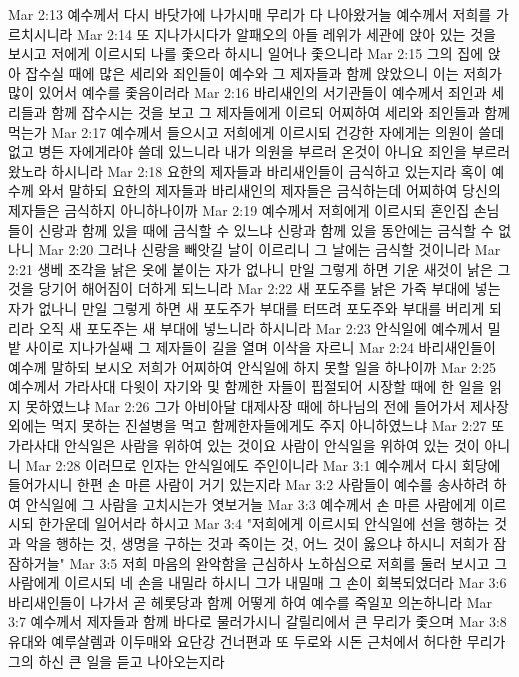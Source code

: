 Mar 2:13  예수께서 다시 바닷가에 나가시매 무리가 다 나아왔거늘 예수께서 저희를 가르치시니라
Mar 2:14  또 지나가시다가 알패오의 아들 레위가 세관에 앉아 있는 것을 보시고 저에게 이르시되 나를 좇으라 하시니 일어나 좇으니라
Mar 2:15  그의 집에 앉아 잡수실 때에 많은 세리와 죄인들이 예수와 그 제자들과 함께 앉았으니 이는 저희가 많이 있어서 예수를 좇음이러라
Mar 2:16  바리새인의 서기관들이 예수께서 죄인과 세리들과 함께 잡수시는 것을 보고 그 제자들에게 이르되 어찌하여 세리와 죄인들과 함께 먹는가
Mar 2:17  예수께서 들으시고 저희에게 이르시되 건강한 자에게는 의원이 쓸데 없고 병든 자에게라야 쓸데 있느니라 내가 의원을 부르러 온것이 아니요 죄인을 부르러 왔노라 하시니라
Mar 2:18  요한의 제자들과 바리새인들이 금식하고 있는지라 혹이 예수께 와서 말하되 요한의 제자들과 바리새인의 제자들은 금식하는데 어찌하여 당신의 제자들은 금식하지 아니하나이까
Mar 2:19  예수께서 저희에게 이르시되 혼인집 손님들이 신랑과 함께 있을 때에 금식할 수 있느냐 신랑과 함께 있을 동안에는 금식할 수 없나니
Mar 2:20  그러나 신랑을 빼앗길 날이 이르리니 그 날에는 금식할 것이니라
Mar 2:21  생베 조각을 낡은 옷에 붙이는 자가 없나니 만일 그렇게 하면 기운 새것이 낡은 그것을 당기어 해어짐이 더하게 되느니라
Mar 2:22  새 포도주를 낡은 가죽 부대에 넣는 자가 없나니 만일 그렇게 하면 새 포도주가 부대를 터뜨려 포도주와 부대를 버리게 되리라 오직 새 포도주는 새 부대에 넣느니라 하시니라
Mar 2:23  안식일에 예수께서 밀밭 사이로 지나가실쌔 그 제자들이 길을 열며 이삭을 자르니
Mar 2:24  바리새인들이 예수께 말하되 보시오 저희가 어찌하여 안식일에 하지 못할 일을 하나이까
Mar 2:25  예수께서 가라사대 다윗이 자기와 및 함께한 자들이 핍절되어 시장할 때에 한 일을 읽지 못하였느냐
Mar 2:26  그가 아비아달 대제사장 때에 하나님의 전에 들어가서 제사장 외에는 먹지 못하는 진설병을 먹고 함께한자들에게도 주지 아니하였느냐
Mar 2:27  또 가라사대 안식일은 사람을 위하여 있는 것이요 사람이 안식일을 위하여 있는 것이 아니니
Mar 2:28  이러므로 인자는 안식일에도 주인이니라
Mar 3:1  예수께서 다시 회당에 들어가시니 한편 손 마른 사람이 거기 있는지라
Mar 3:2  사람들이 예수를 송사하려 하여 안식일에 그 사람을 고치시는가 엿보거늘
Mar 3:3  예수께서 손 마른 사람에게 이르시되 한가운데 일어서라 하시고
Mar 3:4  "저희에게 이르시되 안식일에 선을 행하는 것과 악을 행하는 것, 생명을 구하는 것과 죽이는 것, 어느 것이 옳으냐 하시니 저희가 잠잠하거늘"
Mar 3:5  저희 마음의 완악함을 근심하사 노하심으로 저희를 둘러 보시고 그 사람에게 이르시되 네 손을 내밀라 하시니 그가 내밀매 그 손이 회복되었더라
Mar 3:6  바리새인들이 나가서 곧 헤롯당과 함께 어떻게 하여 예수를 죽일꼬 의논하니라
Mar 3:7  예수께서 제자들과 함께 바다로 물러가시니 갈릴리에서 큰 무리가 좇으며
Mar 3:8  유대와 예루살렘과 이두매와 요단강 건너편과 또 두로와 시돈 근처에서 허다한 무리가 그의 하신 큰 일을 듣고 나아오는지라

